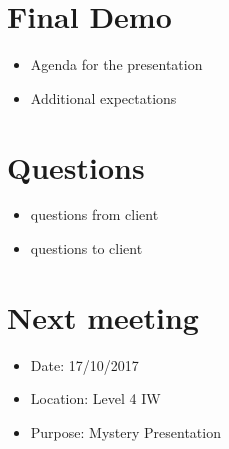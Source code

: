 \documentclass[11pt, a4paper]{article}
\begin{document}
\section{Final Demo}
\begin{itemize}
\item Agenda for the presentation
\item Additional expectations
\end{itemize}

\section{Questions}
\begin{itemize}
\item questions from client
\item questions to client
\end{itemize}


\section{Next meeting}
\begin{itemize}
\item Date: 17/10/2017
\item Location: Level 4 IW
\item Purpose: Mystery Presentation
\end{itemize}

\vspace*{10pt}
\end{document}
